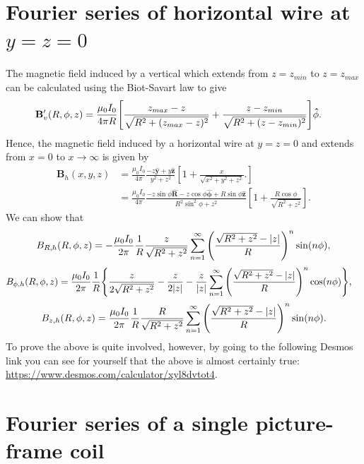 \documentclass{article}
\let\vec\mathbf
\begin{document}
\section{\texorpdfstring{Fourier series of horizontal wire at $y=z=0$}{Fourier series of horizontal wire at y=z=0}}

The magnetic field induced by a vertical which extends from
$z=z_{min}$ to $z=z_{max}$ can be calculated using the Biot-Savart law to give
\[
\begin{aligned}
    \vec{B}_{v}'(R, \phi, z) &= \frac{\mu_0 I_0}{4\pi R}\qty[\frac{z_{max}-z}{\sqrt{R^2+(z_{max}-z)^2}} + \frac{z-z_{min}}{\sqrt{R^2+(z-z_{min})^2}}]\vec{\hat{\phi}}.
\end{aligned}\]
Hence, the magnetic field induced by a horizontal wire at $y=z=0$ 
and extends from $x=0$ to $x\rightarrow\infty$ is given by
\[\begin{aligned}
    \vec{B}_{h}(x, y, z) &= \frac{\mu_0 I_0}{4\pi}\frac{-z\vec{\hat{y}} + y\vec{\hat{z}}}{y^2+z^2}\left[1+\frac{x}{\sqrt{x^2+y^2+z^2}}.\right] \\
    &= \frac{\mu_0 I_0}{4\pi}\frac{-z\sin\phi\vec{\hat{R}} -z\cos\phi\vec{\hat{\phi}} + R\sin\phi\vec{\hat{z}}}{R^2\sin^2\phi+z^2}\left[1+\frac{R\cos\phi}{\sqrt{R^2+z^2}}\right].
\end{aligned}\]
We can show that
\[\begin{aligned}
B_{R, h}(R, \phi, z) &= -\frac{\mu_0 I_0}{2 \pi}\frac{1}{R}\frac{z}{\sqrt{R^2+z^2}}\sum_{n=1}^{\infty}\qty(\frac{\sqrt{R^2+z^2}-\abs{z}}{R})^n\sin(n\phi), \\
\end{aligned}\]
\[\begin{aligned}
    B_{\phi, h}(R, \phi, z)&=\frac{\mu_0 I_0}{2 \pi}\frac{1}{R}\qty{\frac{z}{2\sqrt{R^2+z^2}}-\frac{z}{2\abs{z}}-\frac{z}{\abs{z}}\sum_{n=1}^{\infty}\qty(\frac{\sqrt{R^2+z^2}-\abs{z}}{R})^n\cos(n\phi)},
\end{aligned}
\]
\[\begin{aligned}
B_{z, h}(R, \phi, z) &= \frac{\mu_0 I_0}{2 \pi}\frac{1}{R}\frac{R}{\sqrt{R^2+z^2}}\sum_{n=1}^\infty\qty(\frac{\sqrt{R^2+z^2}-\abs{z}}{R})^n\sin(n\phi). \\
\end{aligned}\]
To prove the above is quite involved, however, by going to the following
Desmos link you can see for yourself that the above is almost certainly true:
\url{https://www.desmos.com/calculator/xyl8dvtot4}.

\section{Fourier series of a single picture-frame coil}
\end{document}
